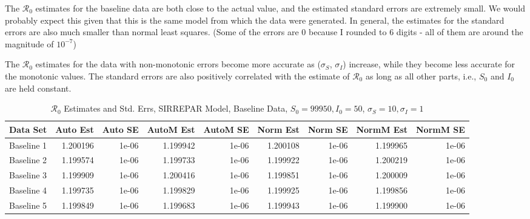 \documentclass[12pt]{article}
\newcommand{\rr}{\ensuremath{\mathcal{R}_0}}
\begin{document}
The $\rr$ estimates for the baseline data are both close to the actual value, and the estimated standard errors are extremely small. We would probably expect this given that this is the same model from which the data were generated. In general, the estimates for the standard errors are also much smaller than normal least squares. (Some of the errors are 0 because I rounded to 6 digits - all of them are around the magnitude of $10 ^ {-7}$)

The $\rr$ estimates for the data with non-monotonic errors become more accurate as ($\sigma_S$, $\sigma_I$) increase, while they become less accurate for the monotonic values. The standard errors are also positively correlated with the estimate of $\rr$ as long as all other parts, i.e., $S_0$ and $I_0$ are held constant.

\begin{table}[H]
	
	\caption{$\rr$ Estimates and Std. Errs, SIRREPAR Model,
		Baseline Data, $S_0 = 99950, I_0 = 50$, 
		$\sigma_S = 10, \sigma_I = 1$}
	\begin{footnotesize}
		\hskip -1cm
	\begin{tabular}{l|r|r|r|r|r|r|r|r}
		\hline
		Data Set & Auto Est & Auto SE & AutoM Est & AutoM SE & Norm Est & Norm SE & NormM Est & NormM SE\\
		\hline
		Baseline 1 & 1.200196 & 1e-06 & 1.199942 & 1e-06 & 1.200108 & 1e-06 & 1.199965 & 1e-06\\
		\hline
		Baseline 2 & 1.199574 & 1e-06 & 1.199733 & 1e-06 & 1.199922 & 1e-06 & 1.200219 & 1e-06\\
		\hline
		Baseline 3 & 1.199909 & 1e-06 & 1.200416 & 1e-06 & 1.199851 & 1e-06 & 1.200009 & 1e-06\\
		\hline
		Baseline 4 & 1.199735 & 1e-06 & 1.199829 & 1e-06 & 1.199925 & 1e-06 & 1.199856 & 1e-06\\
		\hline
		Baseline 5 & 1.199849 & 1e-06 & 1.199683 & 1e-06 & 1.199943 & 1e-06 & 1.199900 & 1e-06\\
		\hline
	\end{tabular}
	\end{footnotesize}
\end{table}
\end{document}
